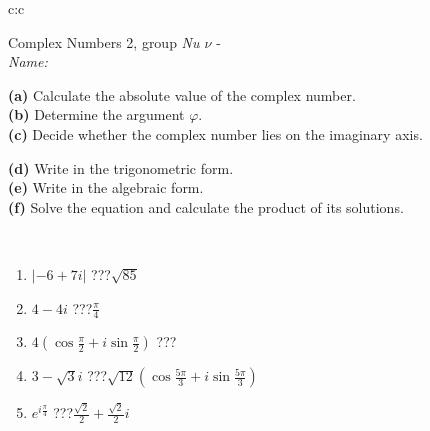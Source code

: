 \documentclass[10pt]{report}
\begin{document}
\newpage
\thispagestyle{empty}
\begin{tabular}{c:c}
\begin{minipage}[c][104.5mm][t]{0.5\linewidth}
\begin{center}
\vspace{5mm}
{\huge Complex Numbers 2, group \textit{Nu $\nu$} -}\\[5mm]
\textit{Name:}\phantom{xxxxxxxxxxxxxxxxxxxxxxxxxxxxxxxxxxxxxxxxxxxxxxxxxxxxxxxxxxxxxxxxx}\\[5mm]
\begin{minipage}{0.95\linewidth}
\begin{center}
{\small \begin{minipage}{0.44\textwidth} \raggedright
\textbf{(a)} Calculate the absolute value of the complex number. \\[1mm]
\textbf{(b)} Determine the argument \(\varphi\). \\[1mm]
\textbf{(c)} Decide whether the complex number lies on the imaginary axis. \end{minipage} \begin{minipage}{0.54\textwidth}
\textbf{(d)} Write in the trigonometric form. \\[1mm]
\textbf{(e)} Write in the algebraic form. \\[1mm]
\textbf{(f)} Solve the equation and calculate the product of its solutions.
\end{minipage}
}
\end{center}
\end{minipage}
\\[1mm]
\begin{minipage}{0.79\linewidth}
\begin{center}
\begin{varwidth}{\linewidth}
\setlength{\itemsep}{0pt}
\begin{enumerate}
\large
\item $|-6+7i|$\quad \dotfill\; ???\;\dotfill \quad $\sqrt{85}$
\item $4-4i$\quad \dotfill\; ???\;\dotfill \quad $\frac{\pi}{4}$
\item $4\left(\cos{\frac{\pi}{2}}+i\sin{\frac{\pi}{2}}\right)$\quad \dotfill\; ???\;\dotfill \quad {}
\item $3-\sqrt{3}i$\quad \dotfill\; ???\;\dotfill \quad $\sqrt{12}\left(\cos{\frac{5\pi}{3}}+i\sin{\frac{5\pi}{3}}\right)$
\item $e^{i\frac{\pi}{4}}$\quad \dotfill\; ???\;\dotfill \quad $\frac{ \sqrt{2}}{2}+\frac{ \sqrt{2}}{2}i$

\end{enumerate}
\end{varwidth}
\end{center}
\end{minipage}
\end{center}
\end{minipage}
\end{tabular}
\end{document}
